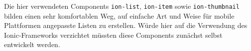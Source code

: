 Die hier verwendeten Components \texttt{ion-list}, \texttt{ion-item} sowie \texttt{ion-thumbnail} bilden einen sehr komfortablen Weg, auf einfache Art und Weise für mobile Plattformen angepasste Listen zu erstellen. Würde hier auf die Verwendung des Ionic-Frameworks verzichtet müssten diese Components zunächst selbst entwickelt werden.
%
%

